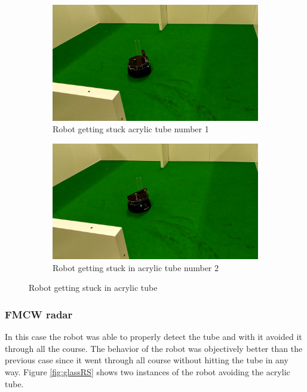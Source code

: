 \begin{figure}[ht!]
  \centering
  \begin{subfigure}[b]{0.49\linewidth}
    \includegraphics[width=\linewidth]{imgs/chapter5/glassLF1.png}
     \caption{Robot getting stuck acrylic tube number 1}
     \label{fig::glassLF1}
  \end{subfigure}
  \begin{subfigure}[b]{0.49\linewidth}
    \includegraphics[width=\linewidth]{imgs/chapter5/glassLF2.png}
    \caption{Robot getting stuck in acrylic tube  number 2}
    \label{fig::glassLF2}
  \end{subfigure}
  \caption{Robot getting stuck in acrylic tube}
  \label{fig:glassLF}
\end{figure}

\subsubsection*{FMCW radar}
In this case the robot was able to properly detect the tube and with it avoided it through all the course. The behavior of the robot was objectively better than the previous case since it went through all course without hitting the tube in any way. Figure \ref{fig:glassRS} shows two instances of the robot avoiding the acrylic tube.

